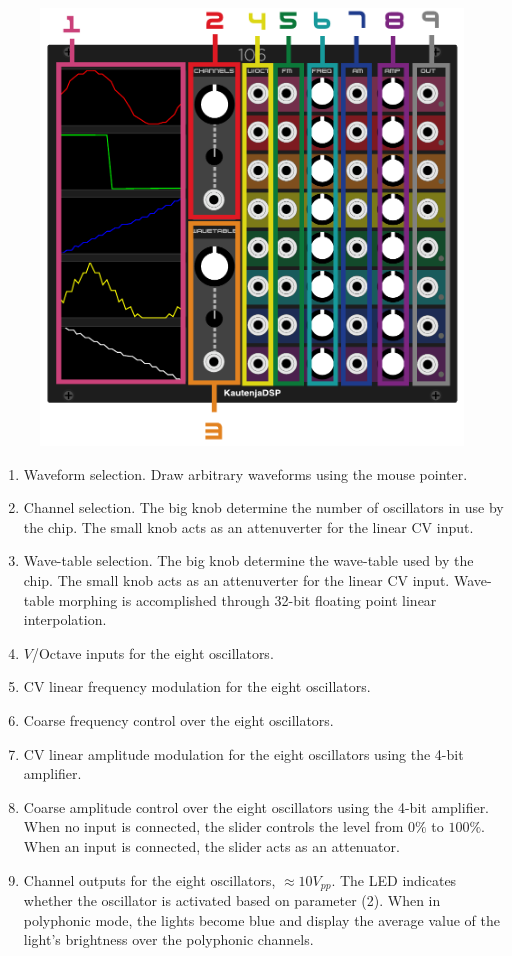 \documentclass[12pt,letter]{article}
\begin{document}
\begin{figure}[!htp]
\centering
\includegraphics{106-Manual}
\end{figure}

\begin{enumerate}
  \item Waveform selection. Draw arbitrary waveforms using the mouse pointer.
  \item Channel selection. The big knob determine the number of oscillators in use by the chip. The small knob acts as an attenuverter for the linear CV input.
  \item Wave-table selection. The big knob determine the wave-table used by the chip. The small knob acts as an attenuverter for the linear CV input. Wave-table morphing is accomplished through 32-bit floating point linear interpolation.
  \item $V$/Octave inputs for the eight oscillators.
  \item CV linear frequency modulation for the eight oscillators.
  \item Coarse frequency control over the eight oscillators.
  \item CV linear amplitude modulation for the eight oscillators using the 4-bit amplifier.
  \item Coarse amplitude control over the eight oscillators using the 4-bit amplifier. When no input is connected, the slider controls the level from $0\%$ to $100\%$. When an input is connected, the slider acts as an attenuator.
  \item Channel outputs for the eight oscillators, ${\approx}10V_{pp}$. The LED indicates whether the oscillator is activated based on parameter (2). When in polyphonic mode, the lights become blue and display the average value of the light's brightness over the polyphonic channels.
\end{enumerate}


\clearpage
\renewcommand\refname{References \& Acknowledgments}
\nocite{*}


\end{document}
